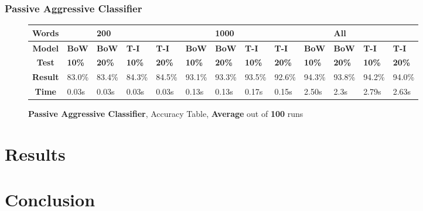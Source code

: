 \documentclass{article}
\begin{document}
	\subsubsection{Passive Aggressive Classifier}
	\begin{figure}[!h]
		\begin{tabular}{||c||l|l|l|l||l|l|l|l||l|l|l|l||}
			\hline
			\textbf{Words} &  & \textbf{200} & & & &\textbf{1000} & & & & \textbf{All} &  & \\ \hline 
			\textbf{Model} & \textbf{BoW} & \textbf{BoW} & \textbf{T-I} & \textbf{T-I} &\textbf{BoW} & \textbf{BoW} & \textbf{T-I} & \textbf{T-I} & \textbf{BoW} & \textbf{BoW} & \textbf{T-I} & \textbf{T-I}\\ \hline
			\textbf{Test} & \textbf{10\%} & \textbf{20\%} & \textbf{10\%} & \textbf{20\%} & \textbf{10\%} & \textbf{20\%} & \textbf{10\%} & \textbf{20\%} & \textbf{10\%} & \textbf{20\%} & \textbf{10\%} & \textbf{20\%} \\ \hline \hline  
			\textbf{Result} & 83.0\% & 83.4\% & 84.3\% & 84.5\% & 93.1\% & 93.3\% & 93.5\% & 92.6\% & 94.3\% & 93.8\% & 94.2\% & 94.0\% \\ \hline 
			\textbf{Time} & 0.03s & 0.03s & 0.03s & 0.03s & 0.13s & 0.13s & 0.17s & 0.15s & 2.50s & 2.3s & 2.79s & 2.63s \\ \hline 
		\end{tabular}
		\caption{\textbf{Passive Aggressive Classifier}, Accuracy Table, \textbf{Average} out of \textbf{100} runs}
	\end{figure}    
    
	\section{Results}
	
	\section{Conclusion}
	
	\begin{thebibliography}{9}

		
	\end{thebibliography}  
\end{document}
